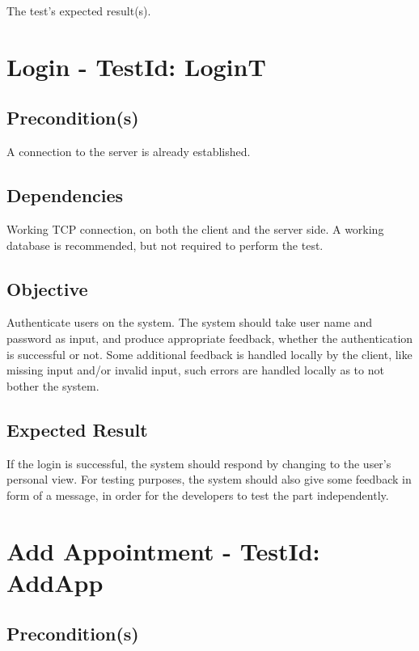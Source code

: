 \documentclass{article}
\begin{document}
The test's expected result(s). \newpage

\section{Login - TestId: LoginT}

\subsection{Precondition(s)}

A connection to the server is already established.

\subsection{Dependencies}

Working TCP connection, on both the client and the server side. A working
database is recommended, but not required to perform the test.

\subsection{Objective}

Authenticate users on the system. The system should take user name and
password as input, and produce appropriate feedback, whether the
authentication is successful or not. Some additional feedback is handled
locally by the client, like missing input and/or invalid input, such errors
are handled locally as to not bother the system.

\subsection{Expected Result}

If the login is successful, the system should respond by changing to the
user's personal view. For testing purposes, the system should also give some
feedback in form of a message, in order for the developers to test the part
independently. \newpage

\section{Add Appointment - TestId: AddApp}

\subsection{Precondition(s)}
\end{document}
